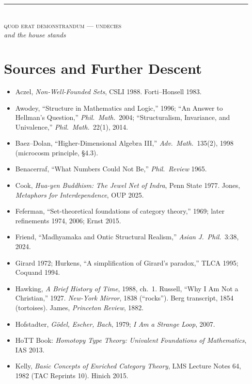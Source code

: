 \documentclass[11pt]{article}
\theoremstyle{plain}
\theoremstyle{definition}
\theoremstyle{remark}
\begin{document}
\vspace{2em}
\begin{center}
\color{silmaril}\rule{0.3\textwidth}{0.4pt}\\[0.6em]
\textsc{quod erat demonstrandum --- undecies}\\[0.3em]
{\color{turtleshell}\itshape and the house stands}
\end{center}

\appendix
\section{Sources and Further Descent}
\begin{itemize}[itemsep=1pt]
\item Aczel, \emph{Non-Well-Founded Sets}, CSLI 1988. Forti--Honsell 1983.
\item Awodey, ``Structure in Mathematics and Logic,'' 1996; ``An Answer to Hellman's Question,'' \emph{Phil.\ Math.}\ 2004; ``Structuralism, Invariance, and Univalence,'' \emph{Phil.\ Math.}\ 22(1), 2014.
\item Baez--Dolan, ``Higher-Dimensional Algebra III,'' \emph{Adv.\ Math.}\ 135(2), 1998 (microcosm principle, \S 4.3).
\item Benacerraf, ``What Numbers Could Not Be,'' \emph{Phil.\ Review} 1965.
\item Cook, \emph{Hua-yen Buddhism: The Jewel Net of Indra}, Penn State 1977. Jones, \emph{Metaphors for Interdependence}, OUP 2025.
\item Feferman, ``Set-theoretical foundations of category theory,'' 1969; later refinements 1974, 2006; Ernst 2015.
\item Friend, ``Madhyamaka and Ontic Structural Realism,'' \emph{Asian J.\ Phil.}\ 3:38, 2024.
\item Girard 1972; Hurkens, ``A simplification of Girard's paradox,'' TLCA 1995; Coquand 1994.
\item Hawking, \emph{A Brief History of Time}, 1988, ch.\ 1. Russell, ``Why I Am Not a Christian,'' 1927. \emph{New-York Mirror}, 1838 (``rocks''). Berg transcript, 1854 (tortoises). James, \emph{Princeton Review}, 1882.
\item Hofstadter, \emph{G\"odel, Escher, Bach}, 1979; \emph{I Am a Strange Loop}, 2007.
\item HoTT Book: \emph{Homotopy Type Theory: Univalent Foundations of Mathematics}, IAS 2013.
\item Kelly, \emph{Basic Concepts of Enriched Category Theory}, LMS Lecture Notes 64, 1982 (TAC Reprints 10). Hinich 2015.

\end{itemize}
\end{document}
